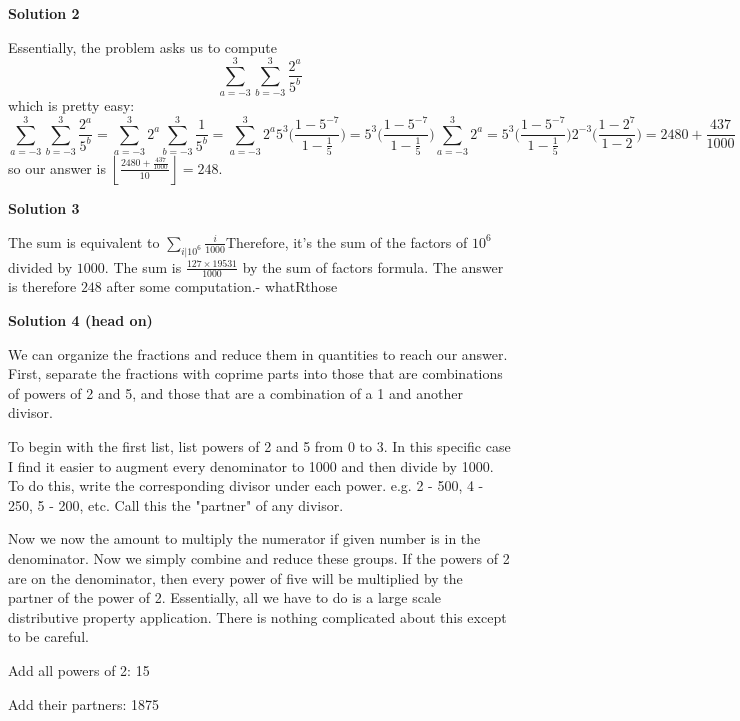\begin{enumerate}
 



\textbf{Solution 2}

Essentially, the problem asks us to compute 
 \[\sum_{a=-3}^3 \sum_{b=-3}^3 \frac{2^a}{5^b}\] which is pretty easy: 
 \[\sum_{a=-3}^3 \sum_{b=-3}^3 \frac{2^a}{5^b} = \sum_{a=-3}^3 2^a \sum_{b=-3}^3 \frac{1}{5^b} = \sum_{a=-3}^3 2^a 5^{3}\bigg( \frac{1-5^{-7}}{1-\frac{1}{5}}    \bigg) = 5^{3}\bigg( \frac{1-5^{-7}}{1-\frac{1}{5}} \bigg) \sum_{a=-3}^3 2^a = 5^{3}\bigg( \frac{1-5^{-7}}{1-\frac{1}{5}} \bigg)2^{-3} \bigg( \frac{1-2^7}{1-2}  \bigg) = 2480 + \frac{437}{1000}\] so our answer is $\left\lfloor \frac{2480 + \frac{437}{1000}}{10} \right\rfloor = \boxed{248}$.

 


 



\textbf{Solution 3}

The sum is equivalent to $\sum_{i | 10^6}^{} \frac{i}{1000}$Therefore, it's the sum of the factors of $10^6$ divided by $1000$. The sum is $\frac{127 \times 19531}{1000}$ by the sum of factors formula. The answer is therefore $\boxed{248}$ after some computation.- whatRthose

 



\textbf{Solution 4 (head on)}

We can organize the fractions and reduce them in quantities to reach our answer. First, separate the fractions with coprime parts into those that are combinations of powers of 2 and 5, and those that are a combination of a 1 and another divisor. 

 To begin with the first list, list powers of 2 and 5 from 0 to 3. In this specific case I find it easier to augment every denominator to 1000 and then divide by 1000. To do this, write the corresponding divisor under each power. e.g. 2 - 500, 4 - 250, 5 - 200, etc. Call this the "partner" of any divisor.

 Now we now the amount to multiply the numerator if given number is in the denominator. Now we simply combine and reduce these groups. If the powers of 2 are on the denominator, then every power of five will be multiplied by the partner of the power of 2. Essentially, all we have to do is a large scale distributive property application. There is nothing complicated about this except to be careful. 

 Add all powers of 2: 15

 Add their partners: 1875


\end{enumerate}
